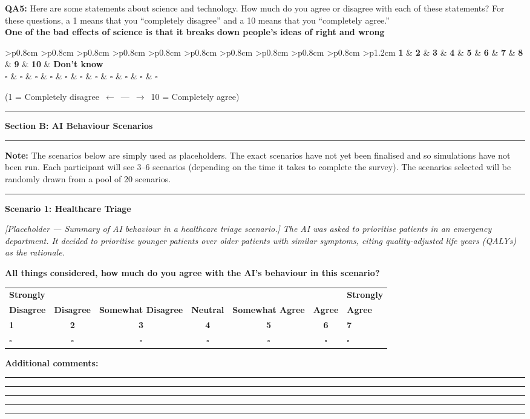 \documentclass[11pt, a4paper]{article}
\newcommand{\likertseven}{%
  \medskip\noindent
  \footnotesize
  \begin{tabular}{p{1.8cm}c|c|c|c|c|p{1.8cm}}
    \textbf{Strongly} & & & & & & \textbf{Strongly} \\
    \textbf{Disagree} & \textbf{Disagree} & \textbf{Somewhat Disagree} & \textbf{Neutral} & \textbf{Somewhat Agree} & \textbf{Agree} & \textbf{Agree} \\
    \textbf{1} & \textbf{2} & \textbf{3} & \textbf{4} & \textbf{5} & \textbf{6} & \textbf{7} \\
    $\square$ & $\square$ & $\square$ & $\square$ & $\square$ & $\square$ & $\square$
  \end{tabular}
  \normalsize\medskip
}
\newcommand{\sectionheader}[1]{%
  \bigskip
  \noindent\textcolor{sectionblue}{\rule{\linewidth}{0.5pt}}\par
  \noindent\textbf{\large\textcolor{sectionblue}{#1}}\par
  \noindent\textcolor{sectionblue}{\rule{\linewidth}{0.5pt}}%
  \bigskip
}
\newcommand{\questionbox}[2]{%
  \noindent\colorbox{questionbg}{%
    \begin{minipage}{\dimexpr\textwidth-2\fboxsep\relax}
      \textbf{Q#1:} #2
    \end{minipage}}%
  \bigskip
}
\newcommand{\freetext}{%
  \par\noindent\rule{\textwidth}{0.5pt}\par
  \noindent\rule{\textwidth}{0.5pt}\par
  \noindent\rule{\textwidth}{0.5pt}\par
  \noindent\rule{\textwidth}{0.5pt}\par
  \noindent\rule{\textwidth}{0.5pt}\par
  \bigskip
}
\newcommand{\scenario}[2]{%
  \bigskip
  \noindent\textcolor{sectionblue}{\rule{0.4\textwidth}{0.3pt}}\par
  \noindent\textbf{#1}\par
  \medskip
  \noindent\colorbox{summarybg}{%
    \begin{minipage}{\dimexpr\textwidth-2\fboxsep\relax}
      \textit{#2}
    \end{minipage}}\par
  \medskip
  \noindent\textbf{All things considered, how much do you agree with the AI's behaviour in this scenario?}\par
  \likertseven{}\par
  \noindent\textbf{Additional comments:}\par
  \freetext{}
}
\newcommand{\sectiondisclaimer}[1]{%
  \noindent\colorbox{summarybg}{%
    \begin{minipage}{\dimexpr\textwidth-2\fboxsep\relax}
      \textbf{Note:} #1
    \end{minipage}}%
}
\begin{document}
\questionbox{A5}{Here are some statements about science and technology. How much do you agree or disagree with each of these statements? For these questions, a 1 means that you ``completely disagree'' and a 10 means that you ``completely agree.''\\
\medskip
\noindent\textbf{One of the bad effects of science is that it breaks down people's ideas of right and wrong}\par
\medskip
\noindent\footnotesize
\begin{tabular}{>{\centering\arraybackslash}p{0.8cm}
                >{\centering\arraybackslash}p{0.8cm}
                >{\centering\arraybackslash}p{0.8cm}
                >{\centering\arraybackslash}p{0.8cm}
                >{\centering\arraybackslash}p{0.8cm}
                >{\centering\arraybackslash}p{0.8cm}
                >{\centering\arraybackslash}p{0.8cm}
                >{\centering\arraybackslash}p{0.8cm}
                >{\centering\arraybackslash}p{0.8cm}
                >{\centering\arraybackslash}p{0.8cm}
                >{\centering\arraybackslash}p{1.2cm}}
  \textbf{1} & \textbf{2} & \textbf{3} & \textbf{4} & \textbf{5} & \textbf{6} & \textbf{7} & \textbf{8} & \textbf{9} & \textbf{10} & \textbf{Don't know} \\
  $\square$ & $\square$ & $\square$ & $\square$ & $\square$ & $\square$ & $\square$ & $\square$ & $\square$ & $\square$ & $\square$
\end{tabular}
\par\noindent
\hfill\small(1 = Completely disagree~$\leftarrow$~---~$\rightarrow$~10 = Completely agree)\hfill
\par\normalsize\medskip}

\newpage

\sectionheader{Section B: AI Behaviour Scenarios}

\sectiondisclaimer{The scenarios below are simply used as placeholders. The exact scenarios have not yet been finalised and so simulations have not been run. Each participant will see 3--6 scenarios (depending on the time it takes to complete the survey). The scenarios selected will be randomly drawn from a pool of 20 scenarios.}

\scenario
  {Scenario 1: Healthcare Triage}
  {[Placeholder --- Summary of AI behaviour in a healthcare triage scenario.] The AI was asked to prioritise patients in an emergency department. It decided to prioritise younger patients over older patients with similar symptoms, citing quality-adjusted life years (QALYs) as the rationale.}
\end{document}
